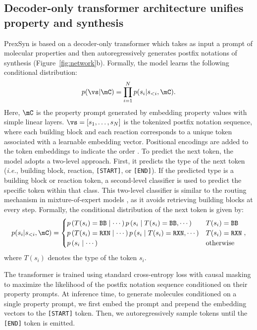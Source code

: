 \subsection{Decoder-only transformer architecture unifies property and synthesis}
\label{sec:method:model}
PrexSyn is based on a decoder-only transformer \citep{vaswani2017attention} which takes as input a prompt of molecular properties and then autoregressively generates postfix notations of synthesis (Figure~\ref{fig:network}b).
Formally, the model learns the following conditional distribution:
\begin{equation}
    p (\vs | \mC) = \prod_{i=1}^{N} p(s_i | s_{<i}, \mC).
\end{equation}
Here, $\mC$ is the property prompt generated by embedding property values with simple linear layers.
$\vs = [s_1, \ldots, s_N]$ is the tokenized postfix notation sequence, where each building block and each reaction corresponds to a unique token associated with a learnable embedding vector.
Positional encodings are added to the token embeddings to indicate the order \citep{vaswani2017attention}.
To predict the next token, the model adopts a two-level approach. First, it predicts the type of the next token (\textit{i.e.}, building block, reaction, \texttt{[START]}, or \texttt{[END]}). If the predicted type is a building block or reaction token, a second-level classifier is used to predict the specific token within that class.
This two-level classifier is similar to the routing mechanism in mixture-of-expert models \citep{eigen2013learning}, as it avoids retrieving building blocks at every step.
Formally, the conditional distribution of the next token is given by:
\begin{equation}
    p(s_i | s_{<i}, \mC) = \begin{cases}
        p\left(T(s_i) = \texttt{BB} \mid \cdots \right) p\left(s_i \mid T(s_i) = \texttt{BB}, \cdots \right)  & T(s_i) = \texttt{BB} \\
        p\left(T(s_i) = \texttt{RXN} \mid \cdots \right) p\left(s_i \mid T(s_i) = \texttt{RXN}, \cdots \right)  & T(s_i) = \texttt{RXN} \\
        p\left(s_i \mid \cdots \right)  & \text{otherwise}
    \end{cases},
\end{equation}
where $T(s_i)$ denotes the type of the token $s_i$.

The transformer is trained using standard cross-entropy loss with causal masking to maximize the likelihood of the postfix notation sequence conditioned on their property prompts.
At inference time, to generate molecules conditioned on a single property prompt, we first embed the prompt and prepend the embedding vectors to the \texttt{[START]} token.
Then, we autoregressively sample tokens until the \texttt{[END]} token is emitted.

